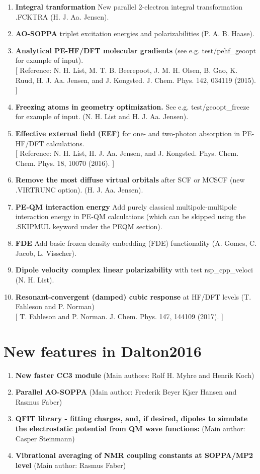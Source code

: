 \begin{enumerate}

\item{\bf Integral tranformation} New parallel 2-electron integral transformation .FCKTRA  (H. J. Aa. Jensen).
\item{\bf AO-SOPPA} triplet excitation energies and polarizabilities (P. A. B. Haase).
\item{\bf Analytical PE-HF/DFT molecular gradients} (see e.g. test/pehf\_geoopt for example of input). \\ {}
  [ Reference: N. H. List, M. T. B. Beerepoot, J. M. H. Olsen, B. Gao, K. Ruud, H. J. Aa. Jensen, and J. Kongsted. J. Chem. Phys. 142, 034119 (2015). ]
\item{\bf Freezing atoms in geometry optimization.}
  See e.g. test/geoopt\_freeze for example of input.  (N. H. List and H. J. Aa. Jensen).
\item{\bf Effective external field (EEF)} for one- and two-photon absorption in PE-HF/DFT calculations.\\ {}
  [ Reference: N. H. List, H. J. Aa. Jensen, and J. Kongsted. Phys. Chem. Chem. Phys. 18, 10070 (2016). ]
\item{\bf Remove the most diffuse virtual orbitals} after SCF or MCSCF (new .VIRTRUNC option). (H. J. Aa. Jensen).
\item{\bf PE-QM interaction energy} Add purely classical multipole-multipole interaction energy in PE-QM calculations (which can be skipped using the .SKIPMUL keyword under the \*PEQM section).
\item{\bf FDE} Add basic frozen density embedding (FDE) functionality (A. Gomes, C. Jacob, L. Visscher).
\item{\bf Dipole velocity complex linear polarizability} with test rsp\_cpp\_veloci (N. H. List).
\item{\bf Resonant-convergent (damped) cubic response} at HF/DFT levels (T. Fahleson and P. Norman)\\ {}
  [ T. Fahleson and P. Norman. J. Chem. Phys. 147, 144109 (2017). ]
 
 \end{enumerate}

\section{New features in Dalton2016}

\begin{enumerate}
\item{\bf New faster CC3 module}
(Main authors: Rolf H. Myhre and Henrik Koch)
\item{\bf Parallel AO-SOPPA}
(Main author: Frederik Beyer Kjær Hansen and Rasmus Faber)
\item{\bf QFIT library - fitting charges, and, if desired, dipoles to simulate the electrostatic potential from QM wave functions:}
(Main author: Casper Steinmann)
\item{\bf Vibrational averaging of NMR coupling constants at SOPPA/MP2 level} 
(Main author: Rasmus Faber)
\end{enumerate}

